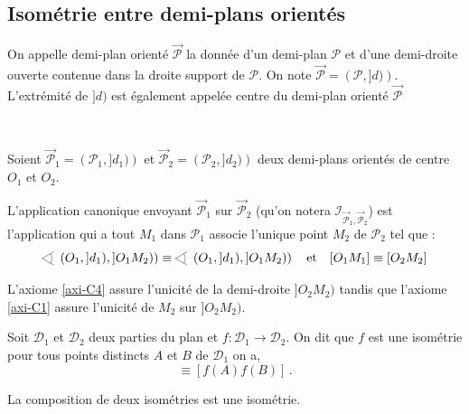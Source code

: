         \subsection{Isométrie entre demi-plans orientés}

\begin{defi}
On appelle demi-plan orienté $\overrightarrow{\mathcal{P}}$ la donnée d'un demi-plan $\mathcal{P}$ et d'une demi-droite ouverte contenue dans la droite support de $\mathcal{P}$. On note $\overrightarrow{\mathcal{P}} = \left(\mathcal{P},]d)\right)$. L'extrémité de $]d)$ est également appelée centre du demi-plan orienté $\overrightarrow{\mathcal{P}}$
\end{defi}

\begin{defi}\,

Soient $\overrightarrow{\mathcal{P}}_1 = \left(\mathcal{P}_1,]d_1)\right)$ et $\overrightarrow{\mathcal{P}}_2 = \left(\mathcal{P}_2,]d_2)\right)$ deux demi-plans orientés de centre $O_1$ et $O_2$. 

L'application canonique envoyant $\overrightarrow{\mathcal{P}}_1$ sur $\overrightarrow{\mathcal{P}}_2$ (qu'on notera $\mathcal{I}_{\overrightarrow{\mathcal{P}}_1,\overrightarrow{\mathcal{P}}_2}$) est l'application qui a tout $M_1$ dans $\mathcal{P}_1$ associe l'unique point $M_2$ de $\mathcal{P}_2$ tel que :
\begin{equation*}
    \anglesaillant \left(O_1,]d_1),]O_1 M_2)\right)\equiv \anglesaillant \left(O_1,]d_1),]O_1 M_2)\right) \quad\text{et}\quad [O_1 M_1]\equiv [O_2 M_2]
\end{equation*}
\end{defi}
\begin{rema}
    L'axiome \ref{axi-C4} assure l'unicité de la demi-droite $]O_2 M_2)$ tandis que l'axiome \ref{axi-C1} assure l'unicité de $M_2$ sur $]O_2 M_2)$.
\end{rema}
\begin{defi}[Isométrie]
    Soit $\mathcal{D}_1$ et $\mathcal{D}_2$ deux parties du plan et $f : \mathcal{D}_1 \to \mathcal{D}_2$. On dit que $f$ est une isométrie \ssi pour tous points distincts $A$ et $B$ de $\mathcal{D}_1$ on a,
    \begin{equation*}
        [AB]\equiv [f(A)f(B)]\,.
    \end{equation*}
\end{defi}
\begin{prop}
    La composition de deux isométries est une isométrie.
\end{prop}
